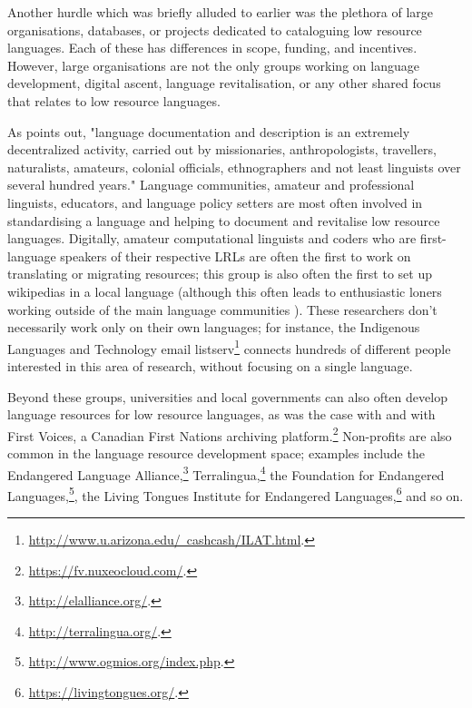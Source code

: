Another hurdle which was briefly alluded to earlier was the plethora of large organisations, databases, or projects dedicated to cataloguing low resource languages. Each of these has differences in scope, funding, and incentives. However, large organisations are not the only groups working on language development, digital ascent, language revitalisation, or any other shared focus that relates to low resource languages.

As \citet{hammarstrom2015unesco} points out, "language documentation and description is an extremely decentralized activity, carried out by missionaries, anthropologists, travellers, naturalists, amateurs, colonial officials, ethnographers and not least linguists over several hundred years." Language communities, amateur and professional linguists, educators, and language policy setters are most often involved in standardising a language and helping to document and revitalise low resource languages. Digitally, amateur computational linguists and coders who are first-language speakers of their respective LRLs are often the first to work on translating or migrating resources; this group is also often the first to set up wikipedias in a local language (although this often leads to enthusiastic loners working outside of the main language communities \citep{soria2017digital}). These researchers don't necessarily work only on their own languages; for instance, the Indigenous Languages and Technology email listserv\footnote{\href{http://www.u.arizona.edu/~cashcash/ILAT.html}{http://www.u.arizona.edu/~cashcash/ILAT.html}. } connects hundreds of different people interested in this area of research, without focusing on a single language.

Beyond these groups, universities and local governments can also often develop language resources for low resource languages, as was the case with \citet{rognvaldsson2009icelandic} and with First Voices, a Canadian First Nations archiving platform.\footnote{\href{https://fv.nuxeocloud.com/}{https://fv.nuxeocloud.com/}. } Non-profits are also common in the language resource development space; examples include the Endangered Language Alliance,\footnote{\href{http://elalliance.org/}{http://elalliance.org/}. } Terralingua,\footnote{\href{http://terralingua.org/}{http://terralingua.org/}. } the Foundation for Endangered Languages,\footnote{\href{http://www.ogmios.org/index.php}{http://www.ogmios.org/index.php}. }, the Living Tongues Institute for Endangered Languages,\footnote{\href{https://livingtongues.org/}{https://livingtongues.org/}. } and so on.

